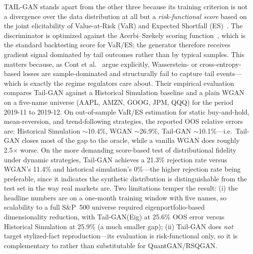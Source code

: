 \documentclass[11pt,a4paper]{article}
\begin{document}
TAIL-GAN \citep{cont2025tailgan} stands apart from the other three because its training criterion is not a divergence over the data distribution at all but a \emph{risk-functional score} based on the joint elicitability of Value-at-Risk (VaR) and Expected Shortfall (ES)~\citep{acerbi2002coherence,acerbi2014expected}. The discriminator is optimized against the Acerbi--Szekely scoring function~\citep{acerbi2014expected}, which is the standard backtesting score for VaR/ES; the generator therefore receives gradient signal dominated by tail outcomes rather than by typical samples. This matters because, as Cont et al.~\citep{cont2025tailgan} argue explicitly, Wasserstein- or cross-entropy-based losses are sample-dominated and structurally fail to capture tail events---which is exactly the regime regulators care about. Their empirical evaluation compares Tail-GAN against a Historical Simulation baseline and a plain WGAN on a five-name universe (AAPL, AMZN, GOOG, JPM, QQQ) for the period 2019-11 to 2019-12. On out-of-sample VaR/ES estimation for static buy-and-hold, mean-reversion, and trend-following strategies, the reported OOS relative errors are: Historical Simulation $\sim$10.4\%, WGAN $\sim$26.9\%, Tail-GAN $\sim$10.1\%---i.e.\ Tail-GAN closes most of the gap to the oracle, while a vanilla WGAN does roughly 2.5$\times$ worse. On the more demanding score-based test of distributional fidelity under dynamic strategies, Tail-GAN achieves a 21.3\% rejection rate versus WGAN's 11.4\% and historical simulation's 0\%---the higher rejection rate being preferable, since it indicates the synthetic distribution is distinguishable from the test set in the way real markets are. Two limitations temper the result: (i) the headline numbers are on a one-month training window with five names, so scalability to a full S\&P~500 universe required eigenportfolio-based dimensionality reduction, with Tail-GAN(Eig) at 25.6\% OOS error versus Historical Simulation at 25.9\% (a much smaller gap); (ii) Tail-GAN does \emph{not} target stylized-fact reproduction---its evaluation is risk-functional only, so it is complementary to rather than substitutable for QuantGAN/RSQGAN.
\end{document}
